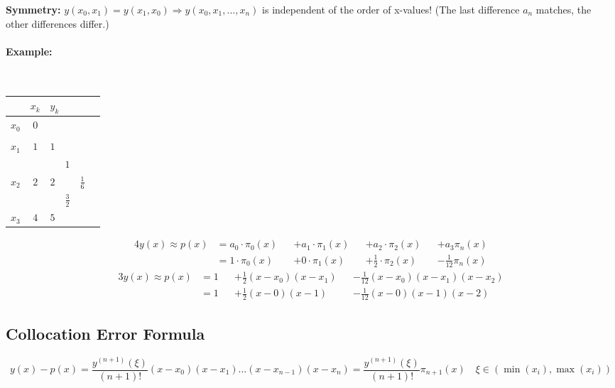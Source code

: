 \textbf{Symmetry:} $y(x_0,x_1) = y(x_1,x_0) \Longrightarrow y(x_0,x_1,...,x_n)$ is independent of the order of x-values! (The last difference $a_n$ matches, the other differences differ.)

\paragraph{Example:}~\\
\begin{minipage}[c]{6.0cm}
	\begin{tabular}{|c||c|llll|}
	\hline
			&$x_k$	&\multicolumn{4}{l|}{$y_k$}\\
	\hline
	$x_0$	&$0$	&\kreisS{$1$}{$a_0$}&			&			&\\
		 	&		&			&\kreisS{$0$}{$a_1$}&			&\\
	$x_1$	&$1$	&$1$		&			&\kreisM{$\frac 12$}{$a_2$}&\\
			&		&			&$1$		&			&\kreisB{$-\frac{1}{12}$}{$a_3$}\\
	$x_2$	&$2$	&$2$		&			&$\frac 16$&\\
			&		&			&$\frac{3}{2}$		&			&\\
	$x_3$	&$4$	&$5$		&			&			&\\
	\hline
	\end{tabular}
\end{minipage}
\hfill
\begin{minipage}[c]{13cm}
	\begin{alignat}{4}
		y(x)\approx p(x)&=a_0\cdot \pi_0(x) &&+a_1\cdot\pi_1(x)  &&+a_2\cdot\pi_2(x)&&+ a_3\pi_n(x)\nonumber\\[0.3cm]
		&=1\cdot \pi_0(x) &&+0\cdot\pi_1(x)  &&+\frac 12\cdot\pi_2(x)&&- \frac 1{12}\pi_n(x)\nonumber %
	\end{alignat}
	\begin{alignat}{3}
	y(x)\approx p(x)&=1&&+\frac 12(x-x_0)(x-x_1)&&-\frac 1{12} (x-x_0)(x-x_1)(x-x_2)\nonumber\\[0.3cm]
	&=1&&+\frac 12(x-0)(x-1)&&-\frac 1{12} (x-0)(x-1)(x-2)\nonumber
	\end{alignat}
\end{minipage}


\subsection{Collocation Error Formula}
$$y(x)-p(x) = \frac{y^{(n+1)}(\xi)}{(n+1)!} (x-x_0)(x-x_1)\ldots(x-x_{n-1})(x-x_n) = \frac{y^{(n+1)}(\xi)}{(n+1)!}\pi_{n+1}(x) \quad \xi \in (\min(x_i), \max(x_i))$$

